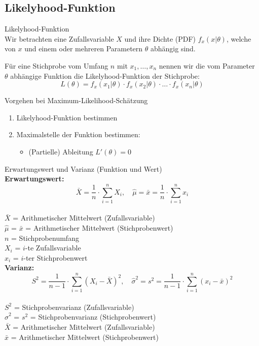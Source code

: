 \subsection{Likelyhood-Funktion}
\begin{definition}{Likelyhood-Funktion}\\
Wir betrachten eine Zufallsvariable $X$ und ihre Dichte (PDF) $f_x(x|\theta)$, welche von $x$ und einem oder mehreren Parametern $\theta$ abhängig sind. 

Für eine Stichprobe vom Umfang $n$ mit $x_1,\ldots,x_n$ nennen wir die vom Parameter $\theta$ abhängige Funktion die Likelyhood-Funktion der Stichprobe:
$$
L(\theta)=f_x(x_1|\theta) \cdot f_x(x_2|\theta) \cdot \ldots \cdot f_x(x_n|\theta)
$$
\end{definition}

\begin{concept}{Vorgehen bei Maximum-Likelihood-Schätzung}\\
\begin{enumerate}
  \item Likelyhood-Funktion bestimmen
  \item Maximalstelle der Funktion bestimmen:
        \begin{itemize}
           \item (Partielle) Ableitung $L'(\theta)=0$
        \end{itemize}
\end{enumerate}
\end{concept}
\begin{definition}{Erwartungswert und Varianz (Funktion und Wert)}\\
\textbf{Erwartungswert:}
$$
\bar{X}=\frac{1}{n} \cdot \sum_{i=1}^n X_i, \quad \hat{\mu}=\bar{x}=\frac{1}{n} \cdot \sum_{i=1}^n x_i
$$
\\
$\bar{X}$ = Arithmetischer Mittelwert (Zufallsvariable)\\
$\hat{\mu}$ = $\bar{x}$ = Arithmetischer Mittelwert (Stichprobenwert)\\
$n$ = Stichprobenumfang\\
$X_i$ = $i$-te Zufallsvariable\\
$x_i$ = $i$-ter Stichprobenwert\\

\textbf{Varianz:}
$$
S^2=\frac{1}{n-1} \cdot \sum_{i=1}^n (X_i-\bar{X})^2, \quad \hat{\sigma}^2=s^2=\frac{1}{n-1} \cdot \sum_{i=1}^n (x_i-\bar{x})^2
$$
\\
$S^2$ = Stichprobenvarianz (Zufallsvariable)\\
$\hat{\sigma}^2$ = $s^2$ = Stichprobenvarianz (Stichprobenwert)\\
$\bar{X}$ = Arithmetischer Mittelwert (Zufallsvariable)\\
$\bar{x}$ = Arithmetischer Mittelwert (Stichprobenwert)
\end{definition}
